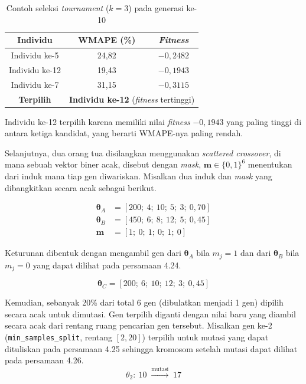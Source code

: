\begin{table}[H]
\centering
\caption{Contoh seleksi \textit{tournament} ($k=3$) pada generasi ke-10}
\label{tab:contoh_tournament}
\begin{tabular}{ccc}
\toprule
\textbf{Individu} & \textbf{WMAPE (\%)} & \textbf{\textit{Fitness}} \\
\midrule
Individu ke-5  & 24{,}82 & $-0{,}2482$ \\
Individu ke-12 & 19{,}43 & $-0{,}1943$ \\
Individu ke-7  & 31{,}15 & $-0{,}3115$ \\
\midrule
\textbf{Terpilih} & \multicolumn{2}{c}{\textbf{Individu ke-12} (\textit{fitness} tertinggi)} \\
\bottomrule
\end{tabular}
\end{table}

Individu ke-12 terpilih karena memiliki nilai \textit{fitness} $-0{,}1943$ yang paling tinggi di antara ketiga kandidat, yang berarti WMAPE-nya paling rendah.

Selanjutnya, dua orang tua disilangkan menggunakan \textit{scattered crossover}, di mana sebuah vektor biner acak, disebut dengan \textit{mask}, $\mathbf{m} \in \{0,1\}^6$ menentukan dari induk mana tiap gen diwariskan. Misalkan dua induk dan \textit{mask} yang dibangkitkan secara acak sebagai berikut.

\begin{align}
\boldsymbol{\theta}_A &= [200;\ 4;\ 10;\ 5;\ 3;\ 0{,}70] \nonumber \\
\boldsymbol{\theta}_B &= [450;\ 6;\ 8;\ 12;\ 5;\ 0{,}45] \nonumber \\
\mathbf{m}            &= [1;\ 0;\ 1;\ 0;\ 1;\ 0]
\end{align}

Keturunan dibentuk dengan mengambil gen dari $\boldsymbol{\theta}_A$ bila $m_j = 1$ dan dari $\boldsymbol{\theta}_B$ bila $m_j = 0$ yang dapat dilihat pada persamaan 4.24.

\begin{equation}
\boldsymbol{\theta}_C = [200;\ 6;\ 10;\ 12;\ 3;\ 0{,}45]
\end{equation}


Kemudian, sebanyak 20\% dari total 6 gen (dibulatkan menjadi 1 gen) dipilih secara acak untuk dimutasi. Gen terpilih diganti dengan nilai baru yang diambil secara acak dari rentang ruang pencarian gen tersebut. Misalkan gen ke-2 (\texttt{min\_samples\_split}, rentang $[2, 20]$) terpilih untuk mutasi yang dapat dituliskan pada persamaan  4.25 
sehingga kromosom setelah mutasi dapat dilihat pada persamaan 4.26.
\begin{equation}
\theta_2:\ 10 \;\xrightarrow{\text{mutasi}}\; 17
\end{equation}

